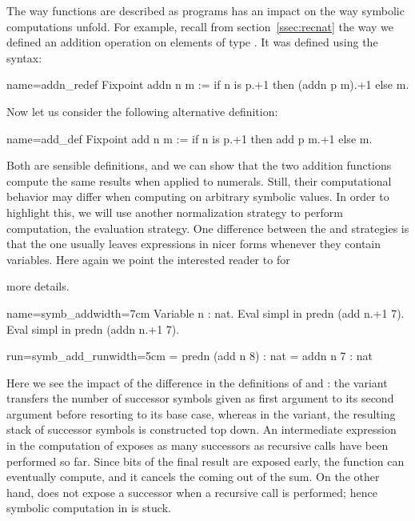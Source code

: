 The way functions are described as programs has an impact on the way
symbolic computations unfold. For example, recall from
section~\ref{ssec:recnat} the way we defined an addition operation on
elements of type . It was defined using the  syntax: %

\begin{coq}{name=addn_redef}{}
Fixpoint addn n m := if n is p.+1 then (addn p m).+1 else m.
\end{coq}

Now let us consider the following alternative definition:

\begin{coq}{name=add_def}{}
Fixpoint add n m := if n is p.+1 then add p m.+1 else m.
\end{coq}

Both are sensible definitions, and we can show that the two addition
functions compute the same results when applied to numerals.  Still,
their computational behavior may differ when computing on arbitrary
symbolic values. In order to highlight this, we will use another
normalization strategy to perform computation, the 
evaluation strategy.  One difference between the 
and  strategies is that the  one usually leaves
expressions in nicer forms whenever they contain variables. Here again
we point the interested reader to \cite[section
5.3.7, ``Performing computations'']{Coq:manual} for

more details.

\begin{coq-left}{name=symb_add}{width=7cm}
Variable n : nat.
Eval simpl in predn (add  n.+1 7).
Eval simpl in predn (addn n.+1 7).
\end{coq-left}
\begin{coqout-right}{run=symb_add_run}{width=5cm}
= predn (add n 8) : nat
= addn n 7 : nat
\end{coqout-right}

Here we see the impact of the difference in the definitions of
 and : the  variant transfers the
number of  successor symbols 
given as first argument to its second argument
before resorting to its base case, whereas in the  variant,
the resulting stack of successor symbols is constructed top down. An
intermediate
expression in the computation of  exposes as many
successors as recursive calls have been performed so far. Since bits
of the final result are exposed early, the  function can
eventually compute, and it cancels the  coming out of the sum.
On the other hand,
 does not expose a successor when a recursive call is
performed; hence symbolic computation in  is stuck.

